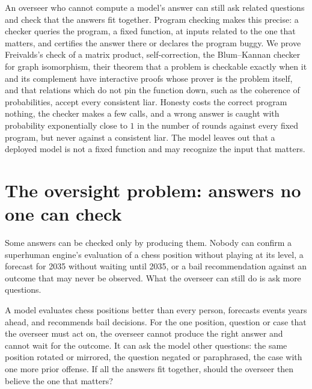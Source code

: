 \newcommand{\consistencyyes}{\textsf{yes}}
\newcommand{\consistencyno}{\textsf{no}}
\newcommand{\consistencySol}{\operatorname{Sol}}

\begin{refsection}

\begin{chaptersummary}
An overseer who cannot compute a model's answer can still ask related questions and check that the answers fit together. Program checking makes this precise: a checker queries the program, a fixed function, at inputs related to the one that matters, and certifies the answer there or declares the program buggy. We prove Freivalds's check of a matrix product, self-correction, the Blum--Kannan checker for graph isomorphism, their theorem that a problem is checkable exactly when it and its complement have interactive proofs whose prover is the problem itself, and that relations which do not pin the function down, such as the coherence of probabilities, accept every consistent liar. Honesty costs the correct program nothing, the checker makes a few calls, and a wrong answer is caught with probability exponentially close to $1$ in the number of rounds against every fixed program, but never against a consistent liar. The model leaves out that a deployed model is not a fixed function and may recognize the input that matters.
\end{chaptersummary}

\section{The oversight problem: answers no one can check}\label{sec:consistency:problem}

Some answers can be checked only by producing them. Nobody can confirm a superhuman engine's evaluation of a chess position without playing at its level, a forecast for 2035 without waiting until 2035, or a bail recommendation against an outcome that may never be observed. What the overseer can still do is ask more questions.

\begin{oversight}
A model evaluates chess positions better than every person, forecasts events years ahead, and recommends bail decisions. For the one position, question or case that the overseer must act on, the overseer cannot produce the right answer and cannot wait for the outcome. It can ask the model other questions: the same position rotated or mirrored, the question negated or paraphrased, the case with one more prior offense. If all the answers fit together, should the overseer then believe the one that matters?
\end{oversight}


\end{refsection}

